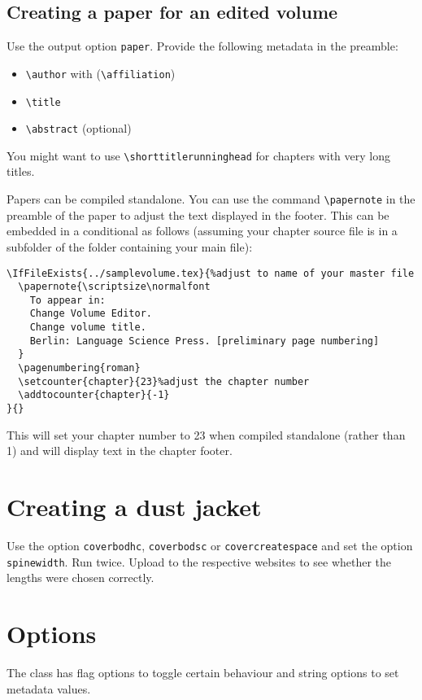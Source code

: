 \documentclass[%
output=guidelines,
guidelines]{langscibook}
\begin{document}
\section{Creating a paper for an edited volume}
Use the output option \texttt{paper}. Provide the following metadata in the preamble:
\begin{itemize}
 \item \verb+\author+ with (\verb+\affiliation+)
 \item \verb+\title+
 \item \verb+\abstract+ (optional)
\end{itemize}

You might want to use \verb+\shorttitlerunninghead+ for chapters with very long titles.

Papers can be compiled standalone. You can use the command \verb+\papernote+ in the preamble of the paper to adjust the text displayed in the footer.  This can be embedded in a conditional as follows (assuming your chapter source file is in a subfolder of the folder containing your main file):
\begin{verbatim}
\IfFileExists{../samplevolume.tex}{%adjust to name of your master file
  \papernote{\scriptsize\normalfont
    To appear in:
    Change Volume Editor.
    Change volume title.
    Berlin: Language Science Press. [preliminary page numbering]
  }
  \pagenumbering{roman}
  \setcounter{chapter}{23}%adjust the chapter number
  \addtocounter{chapter}{-1}
}{}
\end{verbatim}

This will set your chapter number to 23 when compiled standalone (rather than 1) and will display text in the chapter footer.



\chapter{Creating a dust jacket}
Use the option \texttt{coverbodhc}, \texttt{coverbodsc} or \texttt{covercreatespace} and set the option \texttt{spinewidth}. Run {\XeLaTeX} twice. Upload to the respective websites to see whether the lengths were chosen correctly.

\chapter{Options}
The class has flag options to toggle certain behaviour and string options to set metadata values.
\end{document}

